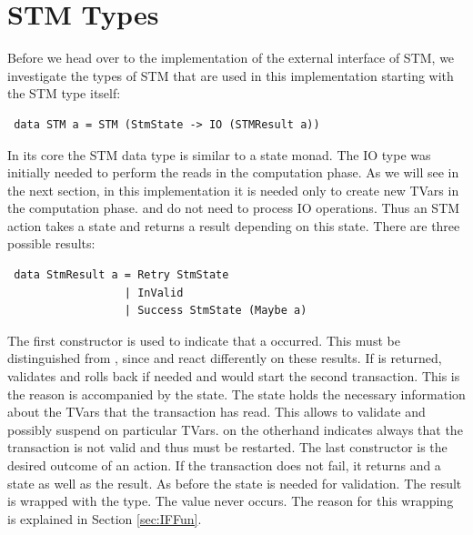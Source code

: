 \section{STM Types}
Before we head over to the implementation of the external interface of STM, we investigate the types
of STM that are used in this implementation starting with the STM type itself:
\begin{lstlisting}
 data STM a = STM (StmState -> IO (STMResult a))
\end{lstlisting}
In its core the STM data type is similar to a state monad. The IO type was initially needed to perform the reads 
in the computation phase. As we will see in the next section, in this implementation it is needed only to create new TVars
in the computation phase.  and  do not need to process IO operations.
Thus an STM action takes a state and returns a result depending on this state. There are three possible 
results:
\begin{lstlisting}
 data StmResult a = Retry StmState
                  | InValid
                  | Success StmState (Maybe a)
\end{lstlisting}
The first constructor is used to indicate that a  occurred. This must be distinguished from 
, since  and  react differently on these results. If 
 is returned,  validates and rolls back if needed and  
would start the second transaction. This is the reason  is accompanied by the state.
The state holds the necessary information about the TVars that the transaction has read. This allows 
to validate and possibly suspend on particular TVars.  on the otherhand indicates
always that the transaction is not valid and thus must be restarted. 
The last constructor is the desired outcome of an action. If the transaction does not fail, it returns
 and a state as well as the result. As before the state is needed for validation.
The result is wrapped with the  type. The value  never occurs. 
The reason for this wrapping is explained in Section \ref{sec:IFFun}. 

